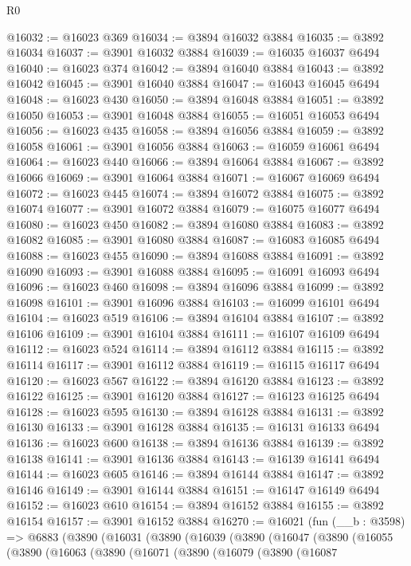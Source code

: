 \begin{lexlean}{R0}
\begin{coremodule}
@16032 := @16023 @369
@16034 := @3894 @16032 @3884
@16035 := @3892 @16034
@16037 := @3901 @16032 @3884
@16039 := @16035 @16037 @6494
@16040 := @16023 @374
@16042 := @3894 @16040 @3884
@16043 := @3892 @16042
@16045 := @3901 @16040 @3884
@16047 := @16043 @16045 @6494
@16048 := @16023 @430
@16050 := @3894 @16048 @3884
@16051 := @3892 @16050
@16053 := @3901 @16048 @3884
@16055 := @16051 @16053 @6494
@16056 := @16023 @435
@16058 := @3894 @16056 @3884
@16059 := @3892 @16058
@16061 := @3901 @16056 @3884
@16063 := @16059 @16061 @6494
@16064 := @16023 @440
@16066 := @3894 @16064 @3884
@16067 := @3892 @16066
@16069 := @3901 @16064 @3884
@16071 := @16067 @16069 @6494
@16072 := @16023 @445
@16074 := @3894 @16072 @3884
@16075 := @3892 @16074
@16077 := @3901 @16072 @3884
@16079 := @16075 @16077 @6494
@16080 := @16023 @450
@16082 := @3894 @16080 @3884
@16083 := @3892 @16082
@16085 := @3901 @16080 @3884
@16087 := @16083 @16085 @6494
@16088 := @16023 @455
@16090 := @3894 @16088 @3884
@16091 := @3892 @16090
@16093 := @3901 @16088 @3884
@16095 := @16091 @16093 @6494
@16096 := @16023 @460
@16098 := @3894 @16096 @3884
@16099 := @3892 @16098
@16101 := @3901 @16096 @3884
@16103 := @16099 @16101 @6494
@16104 := @16023 @519
@16106 := @3894 @16104 @3884
@16107 := @3892 @16106
@16109 := @3901 @16104 @3884
@16111 := @16107 @16109 @6494
@16112 := @16023 @524
@16114 := @3894 @16112 @3884
@16115 := @3892 @16114
@16117 := @3901 @16112 @3884
@16119 := @16115 @16117 @6494
@16120 := @16023 @567
@16122 := @3894 @16120 @3884
@16123 := @3892 @16122
@16125 := @3901 @16120 @3884
@16127 := @16123 @16125 @6494
@16128 := @16023 @595
@16130 := @3894 @16128 @3884
@16131 := @3892 @16130
@16133 := @3901 @16128 @3884
@16135 := @16131 @16133 @6494
@16136 := @16023 @600
@16138 := @3894 @16136 @3884
@16139 := @3892 @16138
@16141 := @3901 @16136 @3884
@16143 := @16139 @16141 @6494
@16144 := @16023 @605
@16146 := @3894 @16144 @3884
@16147 := @3892 @16146
@16149 := @3901 @16144 @3884
@16151 := @16147 @16149 @6494
@16152 := @16023 @610
@16154 := @3894 @16152 @3884
@16155 := @3892 @16154
@16157 := @3901 @16152 @3884
@16270 := @16021
    (fun (__b : @3598) =>
    @6883
      (@3890
        (@16031
          (@3890
            (@16039
              (@3890
                (@16047
                  (@3890
                    (@16055
                      (@3890
                        (@16063
                          (@3890
                            (@16071
                              (@3890
                                (@16079
                                  (@3890
                                    (@16087

\end{coremodule}
\end{lexlean}
